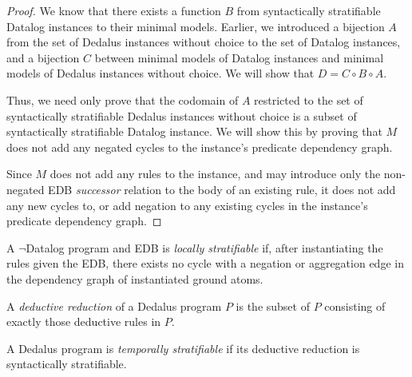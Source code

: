 \begin{proof}
%
We know that there exists a function $B$ from syntactically stratifiable
Datalog instances to their minimal models.  Earlier, we introduced  a bijection  $A$ from the set of
Dedalus instances without choice to the set of Datalog instances, and a
bijection $C$ between minimal models of Datalog instances and minimal models of
Dedalus instances without choice.  We will show that $D = C \circ B \circ A$.

Thus, we need only prove that the codomain of $A$ restricted to the set of
syntactically stratifiable Dedalus instances without choice is a subset of
syntactically stratifiable Datalog instance.  We will show this by proving that
$M$ does not add any negated cycles to the instance's predicate dependency
graph.  

Since $M$ does not add any rules to the instance, and may introduce only the
non-negated EDB {\em successor} relation to the body of an existing rule, it
does not add any new cycles to, or add negation to any existing cycles in the
instance's predicate dependency graph.
%
\end{proof}

\begin{definition}
%
A $\lnot$Datalog program and EDB is \emph{locally stratifiable} if, after instantiating the rules
given the EDB, there exists no cycle with a negation or aggregation edge in the dependency 
graph of instantiated ground atoms.
%
\end{definition}

%
%

%
%


\begin{definition}
%
A \emph{deductive reduction} of a Dedalus program $P$ is the subset of $P$
consisting of exactly those deductive rules in $P$.
%
\end{definition}

\begin{definition} 
%
A Dedalus program is \emph{temporally stratifiable} if its deductive
reduction is syntactically stratifiable.
%
\end{definition}

